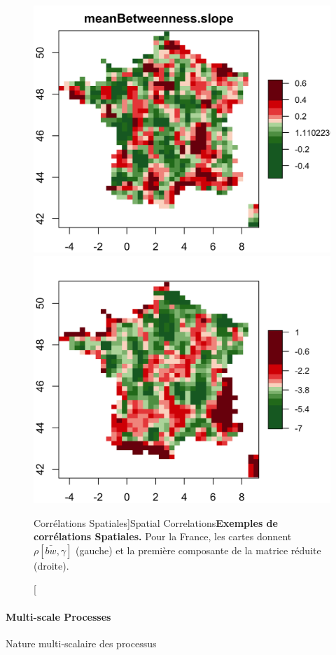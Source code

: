 \begin{figure}[h!]
\includegraphics[width=0.48\linewidth]{Figures/StaticCorrelations/FR_corr_meanBetweenness_slope_rhoasize12}
\includegraphics[width=0.48\linewidth]{Figures/StaticCorrelations/FR_corr_PCA_rhoasize12}
\caption[Spatial Correlations][Corrélations Spatiales]{Spatial Correlations}{\textbf{Exemples de corrélations Spatiales.} Pour la France, les cartes donnent $\rho\left[\bar{bw},\gamma\right]$ (gauche) et la première composante de la matrice réduite (droite).}
\label{fig:staticcorrs:mapscorrs}
\end{figure}



\paragraph{Multi-scale Processes}{Nature multi-scalaire des processus}

